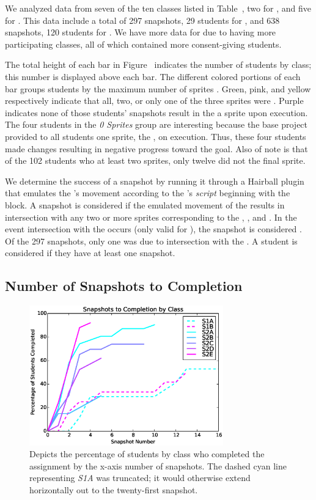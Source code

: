 We analyzed data from seven of the ten classes listed in
Table~, two for \sone{}, and five for \stwo{}. This
data include a total of 297 snapshots, 29 students for \sone{}, and 638
snapshots, 120 students for \stwo{}. We have more data for \stwo{} due to
having more participating classes, all of which contained more consent-giving
students.

The total height of each bar in Figure~
indicates the number of students by class; this number is displayed above each
bar. The different colored portions of each bar groups students by the maximum
number of sprites \caught{}. Green, pink, and yellow respectively indicate that
all, two, or only one of the three sprites were \caught{}. Purple indicates
none of those students' snapshots result in the \net{}  a sprite
upon execution. The four students in the \emph{0 Sprites} group are interesting
because the base project provided to all students  one sprite, the
\zebra{}, on execution. Thus, these four students made changes resulting in
negative progress toward the goal. Also of note is that of the 102 students who
\caught{} at least two sprites, only twelve did not \catch{} the final sprite.

We determine the success of a snapshot by running it through a Hairball plugin
that emulates the \net{}'s movement according to the \net{}'s \emph{script}
beginning with the \netclicked{} block. A snapshot is considered \com{} if the
emulated movement of the \net{} results in intersection with any two or more
sprites corresponding to the \bear{}, \horse{}, and \zebra{}. In the event
intersection with the \snake{} occurs (only valid for \sone{}), the snapshot is
considered \incom{}. Of the 297 \sone{} snapshots, only one was \incom{} due to
intersection with the \snake{}. A student is considered \com{} if they have at
least one \com{} snapshot.

\subsection{Number of Snapshots to Completion}

\begin{figure}[!t]
\centering \includegraphics[width=3.3in]{graphs/snapshots_to_completion.eps}
\caption{Depicts the percentage of students by class who completed the
  assignment by the x-axis number of snapshots. The dashed cyan line
  representing \emph{S1A} was truncated; it would otherwise extend horizontally
  out to the twenty-first snapshot.}
\end{figure}

